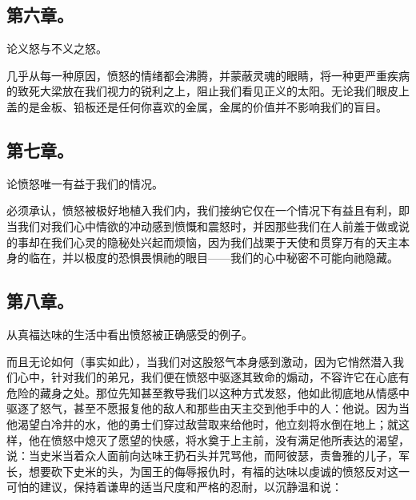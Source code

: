 
\subsection{第六章。}

论义怒与不义之怒。\par

几乎从每一种原因，愤怒的情绪都会沸腾，并蒙蔽灵魂的眼睛，将一种更严重疾病的致死大梁放在我们视力的锐利之上，阻止我们看见正义的太阳。无论我们眼皮上盖的是金板、铅板还是任何你喜欢的金属，金属的价值并不影响我们的盲目。\par


\subsection{第七章。}

论愤怒唯一有益于我们的情况。\par

必须承认，愤怒被极好地植入我们内，我们接纳它仅在一个情况下有益且有利，即当我们对我们心中情欲的冲动感到愤慨和震怒时，并因那些我们在人前羞于做或说的事却在我们心灵的隐秘处兴起而烦恼，因为我们战栗于天使和贯穿万有的天主本身的临在，并以极度的恐惧畏惧祂的眼目——我们的心中秘密不可能向祂隐藏。\par


\subsection{第八章。}

从真福达味的生活中看出愤怒被正确感受的例子。\par

而且无论如何（事实如此），当我们对这股怒气本身感到激动，因为它悄然潜入我们心中，针对我们的弟兄，我们便在愤怒中驱逐其致命的煽动，不容许它在心底有危险的藏身之处。那位先知甚至教导我们以这种方式发怒，他如此彻底地从情感中驱逐了怒气，甚至不愿报复他的敌人和那些由天主交到他手中的人：他说。因为当他渴望白冷井的水，他的勇士们穿过敌营取来给他时，他立刻将水倒在地上；就这样，他在愤怒中熄灭了愿望的快感，将水奠于上主前，没有满足他所表达的渴望，说：当史米当着众人面前向达味王扔石头并咒骂他，而阿彼瑟，责鲁雅的儿子，军长，想要砍下史米的头，为国王的侮辱报仇时，有福的达味以虔诚的愤怒反对这一可怕的建议，保持着谦卑的适当尺度和严格的忍耐，以沉静温和说：\par

